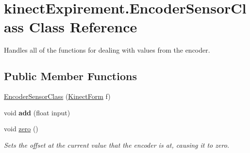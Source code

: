\hypertarget{classkinect_expirement_1_1_encoder_sensor_class}{}\section{kinect\+Expirement.\+Encoder\+Sensor\+Class Class Reference}
\label{classkinect_expirement_1_1_encoder_sensor_class}


Handles all of the functions for dealing with values from the encoder.  


\subsection*{Public Member Functions}
\begin{DoxyCompactItemize}
\item 
\hyperlink{classkinect_expirement_1_1_encoder_sensor_class_ab4717a17fc149c83d7610a979e9d083e}{Encoder\+Sensor\+Class} (\hyperlink{classkinect_expirement_1_1_kinect_form}{Kinect\+Form} f)
\item 
void {\bfseries add} (float input)\hypertarget{classkinect_expirement_1_1_encoder_sensor_class_aa100e345f74bed8630a55caa551ff7dd}{}\label{classkinect_expirement_1_1_encoder_sensor_class_aa100e345f74bed8630a55caa551ff7dd}

\item 
void \hyperlink{classkinect_expirement_1_1_encoder_sensor_class_aec2eabf8a773c805d31a8a616a6850fd}{zero} ()
\begin{DoxyCompactList}\small\item\em Sets the offset at the current value that the encoder is at, causing it to zero. \end{DoxyCompactList}\end{DoxyCompactItemize}
